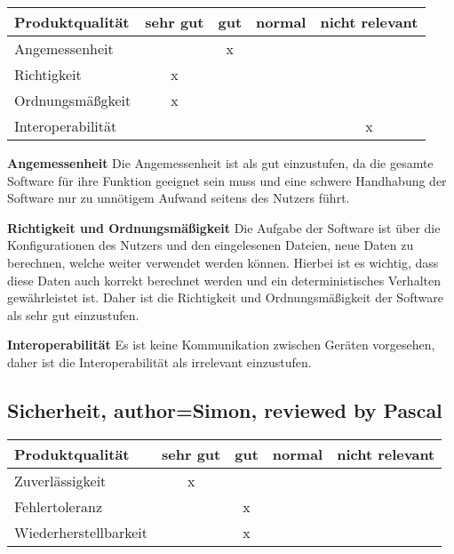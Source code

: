 \documentclass[parskip=full]{scrartcl} %
\begin{document}
\begin{tabular}{|l| c| c| c| c|}
    \hline
        Produktqualität & sehr gut & gut & normal & nicht relevant \\
    \hline
        Angemessenheit & & x & &\\
    \hline
        Richtigkeit & x & & &\\
    \hline
        Ordnungsmäßgkeit & x & & &\\
    \hline
        Interoperabilität & & & & x\\
    \hline
        
    \end{tabular}

\textbf{Angemessenheit}
\newline
Die Angemessenheit ist als gut einzustufen, da die gesamte Software für ihre Funktion geeignet sein muss und eine schwere Handhabung der Software nur zu unnötigem Aufwand seitens des Nutzers führt.



\textbf{Richtigkeit und Ordnungsmäßigkeit}
\newline
Die Aufgabe der Software ist über die Konfigurationen des Nutzers und den eingelesenen Dateien, neue Daten zu berechnen, welche weiter verwendet werden können. Hierbei ist es wichtig, dass diese Daten auch korrekt berechnet werden und ein deterministisches Verhalten gewährleistet ist.
Daher ist die Richtigkeit und Ordnungsmäßigkeit der Software als sehr gut einzustufen.

\textbf{Interoperabilität}
\newline
Es ist keine Kommunikation zwischen Geräten vorgesehen, daher ist die Interoperabilität als irrelevant einzustufen.


\newpage 

\subsection{Sicherheit, author=Simon, reviewed by Pascal}

    \begin{tabular}{|l| c| c| c| c|}
    \hline
        Produktqualität & sehr gut & gut & normal & nicht relevant \\
    \hline
        Zuverlässigkeit & x & & &\\
    \hline
        Fehlertoleranz & & x & &\\
    \hline
        Wiederherstellbarkeit & & x & &\\
    \hline
     \end{tabular}
\end{document}
